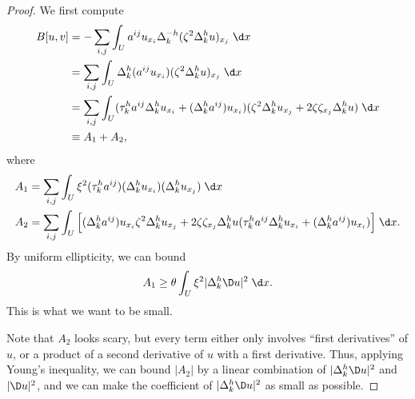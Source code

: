 \documentclass[a4paper]{article}
\begin{document}
\begin{proof}
  We first compute
  \begin{align*}
    B[u, v] &= - \sum_{i, j} \int_U a^{ij} u_{x_i} \Delta_k^{-h} (\zeta^2 \Delta_k^h u)_{x_j}\;\d x\\
    &= \sum_{i, j} \int_U \Delta^h_k (a^{ij} u_{x_i}) (\zeta^2 \Delta_k^h u)_{x_j}\;\d x\\
    &= \sum_{i, j} \int_U (\tau^h_k a^{ij} \Delta_k^h u_{x_i} + (\Delta_k^h a^{ij}) u_{x_i}) (\zeta^2 \Delta^h_k u_{x_j} + 2 \zeta \zeta_{x_j} \Delta_k^h u)\;\d x\\
    &\equiv A_1 + A_2,
  \end{align*}
  where
  \begin{align*}
    A_1 &= \sum_{i, j} \int_U \xi^2 (\tau_k^h a^{ij}) (\Delta_k^h u_{x_i}) (\Delta_k^h u_{x_j})\;\d x\\
    A_2 &= \sum_{i, j} \int_U \Big[ (\Delta^h_k a^{ij}) u_{x_i} \zeta^2 \Delta_k^h u_{x_j} + 2\zeta \zeta_{x_j} \Delta_k^h u (\tau^h_k a^{ij} \Delta_k^h u_{x_i} + (\Delta_k^h a^{ij})u_{x_i})\Big]\;\d x.
  \end{align*}
  By uniform ellipticity, we can bound
  \[
    A_1 \geq \theta \int_U \xi^2 |\Delta_k^h \D u|^2\;\d x.
  \]
  This is what we want to be small.

  Note that $A_2$ looks scary, but every term either only involves ``first derivatives'' of $u$, or a product of a second derivative of $u$ with a first derivative. Thus, applying Young's inequality, we can bound $|A_2|$ by a linear combination of $|\Delta_k^h \D u|^2$ and $|\D u|^2$, and we can make the coefficient of $|\Delta_k^h \D u|^2$ as small as possible.


\end{proof}
\end{document}
